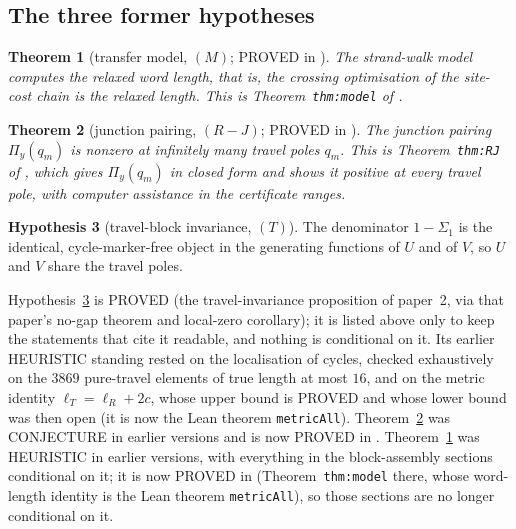 \documentclass[11pt]{article}
\newtheorem{theorem}{Theorem}[section]
\theoremstyle{definition}
\theoremstyle{remark}
\theoremstyle{definition}
\newtheorem{hypothesis}[theorem]{Hypothesis}
\begin{document}
\subsection{The three former hypotheses}
\begin{theorem}[transfer model, $(M)$; PROVED in \cite{paper2}]\label{hyp:M}
The strand-walk model computes the relaxed word length, that is, the crossing optimisation of the
site-cost chain is the relaxed length. This is Theorem~\texttt{thm:model} of \cite{paper2}.
\end{theorem}
\begin{theorem}[junction pairing, $(R\!-\!J)$; PROVED in \cite{paper2}]\label{hyp:RJ}
The junction pairing $\Pi_y(q_m)$ is nonzero at infinitely many travel poles $q_m$. This is
Theorem~\texttt{thm:RJ} of \cite{paper2}, which gives $\Pi_y(q_m)$ in closed form and shows it
positive at every travel pole, with computer assistance in the certificate ranges.
\end{theorem}
\begin{hypothesis}[travel-block invariance, $(T)$]\label{hyp:T}
The denominator $1-\Sigma_1$ is the identical, cycle-marker-free object in the generating
functions of $U$ and of $V$, so $U$ and $V$ share the travel poles.
\end{hypothesis}

Hypothesis~\ref{hyp:T} is PROVED (the travel-invariance proposition of paper~2, via
that paper's no-gap theorem and local-zero corollary); it is listed above only to keep the
statements that cite it readable, and nothing is conditional on it. Its earlier HEURISTIC standing
rested on the localisation of cycles, checked exhaustively on the $3869$ pure-travel elements of
true length at most $16$, and on the metric identity $\ell_T=\ell_R+2c$, whose upper bound is
PROVED and whose lower bound was then open (it is now the Lean theorem \texttt{metricAll}). Theorem~\ref{hyp:RJ} was CONJECTURE in earlier versions
and is now PROVED in \cite{paper2}. Theorem~\ref{hyp:M} was HEURISTIC in earlier versions, with
everything in the block-assembly sections conditional on it; it is now PROVED in \cite{paper2}
(Theorem~\texttt{thm:model} there, whose word-length identity is the Lean theorem
\texttt{metricAll}), so those sections are no longer conditional on it.
\end{document}
